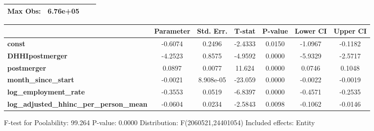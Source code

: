 \documentclass{report}
\begin{document}
\begin{center}
\begin{tabular}{lclc}
\textbf{Max Obs:}                                &       6.76e+05       & \textbf{                     }   &                  \\
\bottomrule
\end{tabular}
\begin{tabular}{lcccccc}
                                                 & \textbf{Parameter} & \textbf{Std. Err.} & \textbf{T-stat} & \textbf{P-value} & \textbf{Lower CI} & \textbf{Upper CI}  \\
\midrule
\textbf{const}                                   &      -0.6074       &       0.2496       &     -2.4333     &      0.0150      &      -1.0967      &      -0.1182       \\
\textbf{DHHIpostmerger}                          &      -4.2523       &       0.8575       &     -4.9592     &      0.0000      &      -5.9329      &      -2.5717       \\
\textbf{postmerger}                              &       0.0897       &       0.0077       &      11.624     &      0.0000      &       0.0746      &       0.1048       \\
\textbf{month\_since\_start}                     &      -0.0021       &     8.908e-05      &     -23.059     &      0.0000      &      -0.0022      &      -0.0019       \\
\textbf{log\_employment\_rate}                   &      -0.3553       &       0.0519       &     -6.8397     &      0.0000      &      -0.4571      &      -0.2535       \\
\textbf{log\_adjusted\_hhinc\_per\_person\_mean} &      -0.0604       &       0.0234       &     -2.5843     &      0.0098      &      -0.1062      &      -0.0146       \\
\bottomrule
\end{tabular}
\end{center}

F-test for Poolability: 99.264 \newline
 P-value: 0.0000 \newline
 Distribution: F(2060521,24401054) \newline
  \newline
 Included effects: Entity
\end{document}
